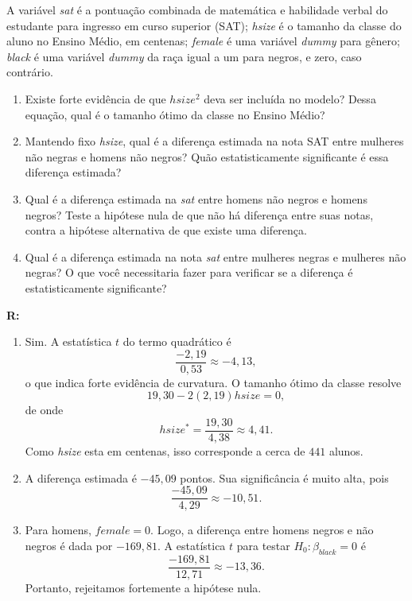 \documentclass[12pt,letterpaper, onecolumn]{exam}
\renewenvironment{solution}
{\par\noindent\textbf{R:}\enspace\color{blue}}
{\par\color{black}}
\begin{document}
\begin{questions}
A variável \textit{sat} é a pontuação combinada de matemática e habilidade verbal do estudante para ingresso em curso superior (SAT); \textit{hsize} é o tamanho da classe do aluno no Ensino Médio, em centenas; \textit{female} é uma variável \textit{dummy} para gênero; \textit{black} é uma variável \textit{dummy} da raça igual a um para negros, e zero, caso contrário.
\begin{enumerate}[label=(\roman*)]
    \item Existe forte evidência de que \(hsize^2\) deva ser incluída no modelo? Dessa equação, qual é o tamanho ótimo da classe no Ensino Médio?
    \item Mantendo fixo \textit{hsize}, qual é a diferença estimada na nota SAT entre mulheres não negras e homens não negros? Quão estatisticamente significante é essa diferença estimada?
    \item Qual é a diferença estimada na \textit{sat} entre homens não negros e homens negros? Teste a hipótese nula de que não há diferença entre suas notas, contra a hipótese alternativa de que existe uma diferença.
    \item Qual é a diferença estimada na nota \textit{sat} entre mulheres negras e mulheres não negras? O que você necessitaria fazer para verificar se a diferença é estatisticamente significante?
\end{enumerate}

\begin{solution}
\begin{enumerate}[label=(\roman*)]
    \item Sim. A estatística \(t\) do termo quadrático é
    \[
    \frac{-2,19}{0,53}\approx -4,13,
    \]
    o que indica forte evidência de curvatura. O tamanho ótimo da classe resolve
    \[
    19,30 - 2(2,19)hsize = 0,
    \]
    de onde
    \[
    hsize^\ast = \frac{19,30}{4,38}\approx 4,41.
    \]
    Como \textit{hsize} esta em centenas, isso corresponde a cerca de \(441\) alunos.

    \item A diferença estimada é \(-45,09\) pontos. Sua significância é muito alta, pois
    \[
    \frac{-45,09}{4,29}\approx -10,51.
    \]

    \item Para homens, \(female=0\). Logo, a diferença entre homens negros e não negros é dada por \(-169,81\). A estatística \(t\) para testar \(H_0:\beta_{black}=0\) é
    \[
    \frac{-169,81}{12,71}\approx -13,36.
    \]
    Portanto, rejeitamos fortemente a hipótese nula.


\end{enumerate}
\end{solution}
\end{questions}
\end{document}

